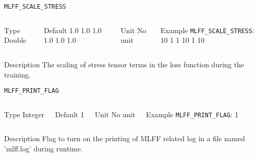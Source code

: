 \begin{frame}[allowframebreaks]{\texttt{{MLFF\_SCALE\_STRESS}}} \label{MLFF_SCALE_STRESS}
\vspace*{-12pt}
\begin{columns}
\begin{block}{Type}
Double
\end{block}

\begin{block}{Default}
1.0 1.0 1.0 1.0 1.0 1.0
\end{block}

\begin{block}{Unit}
No unit
\end{block}

\begin{block}{Example}
\texttt{MLFF\_SCALE\_STRESS}: 10 1 1 10 1 10
\end{block}
\end{columns}

\begin{block}{Description}
 The scaling of stress tensor terms in the loss function during the training.
\end{block}

%
\end{frame}

\begin{frame}[allowframebreaks]{\texttt{{MLFF\_PRINT\_FLAG}}} \label{MLFF_PRINT_FLAG}
\vspace*{-12pt}
\begin{columns}
\begin{block}{Type}
Integer
\end{block}

\begin{block}{Default}
1
\end{block}

\begin{block}{Unit}
No unit
\end{block}

\begin{block}{Example}
\texttt{MLFF\_PRINT\_FLAG}: 1
\end{block}
\end{columns}

\begin{block}{Description}
Flag to turn on the printing of MLFF related log in a file named 'mlff.log' during runtime.
\end{block}

\end{frame}


